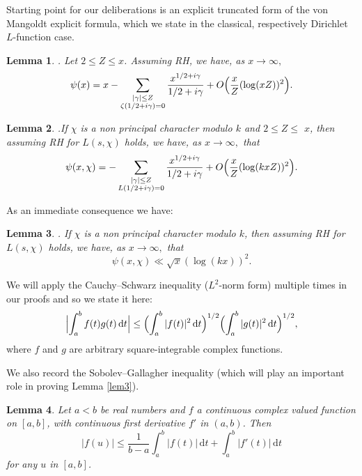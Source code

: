 \documentclass[pdflatex]{sn-jnl}%
\newcommand{\dx}{\mathrm{d}}
\theoremstyle{sltheorems}
\newtheorem{lem}{Lemma}
\theoremstyle{plainrem}
\theoremstyle{definition}
\begin{document}
Starting point for our deliberations is an explicit truncated form of the 
von Mangoldt explicit formula, which we state in the classical, respectively 
Dirichlet $L$-function case.


\begin{lem}\cite[Ch.~17]{Davenport}.
Let $2 \le Z \le x$. Assuming RH, we 
have, as $ x \to \infty,$
\[
\psi(x) = x - \sum_{\substack{ \vert \gamma \vert  \le  Z \\
\zeta(1/2 + i\gamma) = 0}} \frac{x^{1/2 + i\gamma}}{1/2 + i\gamma} +
O\Bigl(\frac{x}{Z} (\log (xZ))^2 \Bigr).
\]
\end{lem}

\begin{lem}\cite[Ch.~19]{Davenport}.\label{davenlem}
If $\chi$ is a non principal 
character modulo $k$ and $2 \le Z  \le $ $x$, then assuming RH for $L(s,\chi)$ holds, we have, as $ x \to \infty,$ that
%
\begin{equation}
\label{explform-all-gammas}
\psi(x,\chi) = - \sum_{\substack{ \vert \gamma \vert  \le  Z \\ L(1/2+i\gamma)=0
}} \frac{x^{1/2 + i\gamma}}{1/2 + i\gamma} +
O\Bigl(\frac{x}{Z} (\log (kxZ))^2 \Bigr).
\end{equation}
%
\end{lem}
%
\noindent
As an immediate consequence we have:
\begin{lem} \cite[Ch.~19--20]{Davenport}.
\label{davenlem3}
If $\chi$ is a non principal 
character modulo $k$, then assuming RH for $L(s,\chi)$ holds, we have, as $ x \to \infty,$ that
%
\begin{equation*}
\psi(x,\chi) \ll \sqrt{x} (\log (kx))^2.
\end{equation*}
\end{lem}

We will apply the Cauchy--Schwarz inequality ($L^2$-norm form) multiple times
in our proofs and so we state it here: 
%
\begin{equation}
\label{Cauchy}
\Bigl \vert  \int_a^b f(t) g(t) \, \dx t \Bigr \vert  
\le 
\Bigl( \int_a^b  \vert f(t) \vert ^2  \, \dx t \Bigr)^{1/2} 
\Bigl( \int_a^b  \vert g(t) \vert ^2 \, \dx t \Bigr)^{1/2},
\end{equation}
where $f$ and $g$ are arbitrary square-integrable complex functions.

We also record the Sobolev--Gallagher inequality (which will play an important role in proving Lemma \ref{lem3}).
\begin{lem} \cite[Lemma~1.1]{Montbook}
\label{Sob-Gal-ineq}
Let $a<b$ be real numbers and $f$ a continuous complex valued function on
$[a,b]$, with continuous first derivative $f'$ in $(a,b)$. Then
%
\begin{equation*}
\vert f(u) \vert  \le \frac{1}{b-a} \int_a^b  \vert f(t) \vert  \, \dx t + \int_a^b  \vert f'(t) \vert  \, \dx t
\end{equation*}
%
for any $u$ in $[a, b]$.
\end{lem}
\end{document}
